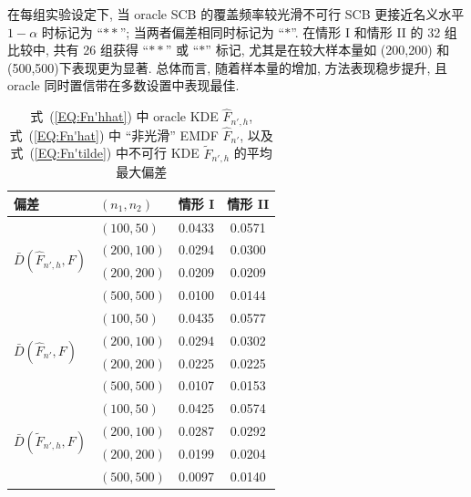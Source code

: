 \documentclass[a4paper,openay,14pt]{ctexbook}
\numberwithin{equation}{section}
\numberwithin{lem}{section}
\begin{document}
在每组实验设定下, 当 oracle SCB 的覆盖频率较光滑不可行 SCB 更接近名义水平 \(1-\alpha\) 时标记为 “$\ast\ast$”; 当两者偏差相同时标记为 “$\ast$”. 在情形 I 和情形 II 的 32 组比较中, 共有 26 组获得 “$\ast\ast$” 或 “$\ast$” 标记, 尤其是在较大样本量如 (200,200) 和 (500,500)下表现更为显著. 总体而言, 随着样本量的增加, 方法表现稳步提升, 且 oracle 同时置信带在多数设置中表现最佳.

{
\setlength{\tabcolsep}{10pt}
\renewcommand{\arraystretch}{1.3}
\begin{table}[htbp]
    \centering
    \caption{式~(\ref{EQ:Fn'hhat}) 中 oracle KDE $\hat{F}_{n',h}$, 式~(\ref{EQ:Fn'hat}) 中 ``非光滑'' EMDF $\hat{F}_{n'}$, 以及式~(\ref{EQ:Fn'tilde}) 中不可行 KDE $\tilde{F}_{n',h}$ 的平均最大偏差
}
    \label{tab:Dbar}
    \begin{tabular}{llcc}
        \toprule
        偏差 & $(n_1,n_2)$ & 情形 I & 情形 II \\
        \midrule
        \multirow{4}{*}{$\bar{D}(\hat{F}_{n',h},F)$} 
            & $(100,50)$    & 0.0433 & 0.0571\\
            & $(200,100)$   & 0.0294 & 0.0300 \\
            & $(200,200)$   & 0.0209 & 0.0209 \\
            & $(500,500)$   & 0.0100 & 0.0144 \\
        \midrule
        \multirow{4}{*}{$\bar{D}(\hat{F}_{n'},F)$} 
            & $(100,50)$    & 0.0435 & 0.0577\\
            & $(200,100)$   & 0.0294 & 0.0302 \\
            & $(200,200)$   & 0.0225 & 0.0225 \\
            & $(500,500)$   & 0.0107 & 0.0153\\
        \midrule
        \multirow{4}{*}{$\bar{D}(\tilde{F}_{n',h},F)$} 
            & $(100,50)$    & 0.0425 & 0.0574 \\
            & $(200,100)$   & 0.0287 & 0.0292 \\
            & $(200,200)$   & 0.0199 & 0.0204 \\
            & $(500,500)$   & 0.0097 & 0.0140\\
        \bottomrule
    \end{tabular}
\end{table}
}
\end{document}

